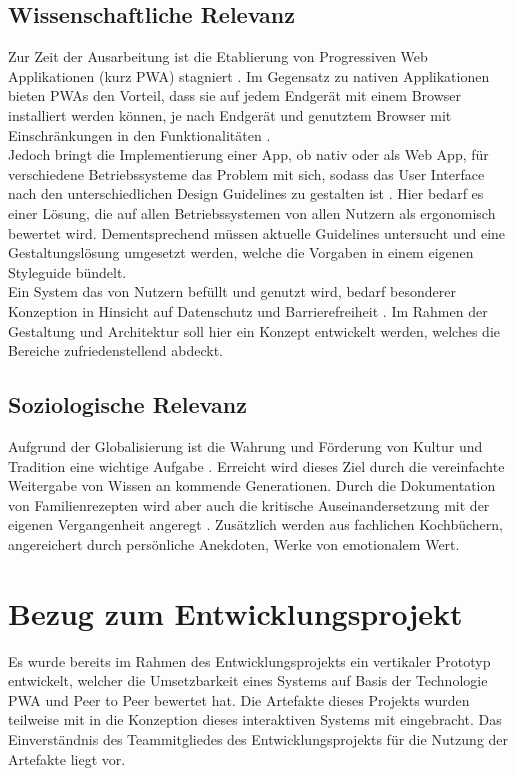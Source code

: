 \subsection{Wissenschaftliche Relevanz}
Zur Zeit der Ausarbeitung ist die Etablierung von Progressiven Web Applikationen (kurz PWA) stagniert \citep{Magomadov_2020}. Im Gegensatz zu nativen Applikationen bieten PWAs den Vorteil, dass sie auf jedem Endgerät mit einem Browser installiert werden können, je nach Endgerät und genutztem Browser mit Einschränkungen in den Funktionalitäten \citep{MScthesi20:online, Progress77:online}. \\
Jedoch bringt die Implementierung einer App, ob nativ oder als Web App, für verschiedene Betriebssysteme das Problem mit sich, sodass das User Interface nach den unterschiedlichen Design Guidelines zu gestalten ist \citep{Mitrovic2016ARO}. Hier bedarf es einer Lösung, die auf allen Betriebssystemen von allen Nutzern als ergonomisch bewertet wird. Dementsprechend müssen aktuelle Guidelines untersucht und eine Gestaltungslösung umgesetzt werden, welche die Vorgaben in einem eigenen Styleguide bündelt.\\
Ein System das von Nutzern befüllt und genutzt wird, bedarf besonderer Konzeption in Hinsicht auf Datenschutz und Barrierefreiheit \citep{Privacya9:online}. Im Rahmen der Gestaltung und Architektur soll hier ein Konzept entwickelt werden, welches die Bereiche zufriedenstellend abdeckt.

\subsection{Soziologische Relevanz}
Aufgrund der Globalisierung ist die Wahrung und Förderung von Kultur und Tradition eine wichtige Aufgabe \citep{BryanTurner_2016}. Erreicht wird dieses Ziel durch die vereinfachte Weitergabe von Wissen an kommende Generationen. Durch die Dokumentation von Familienrezepten wird aber auch die kritische Auseinandersetzung mit der eigenen Vergangenheit angeregt \citep{76f9434be2ae4e23b9f44d93097c915c}. Zusätzlich werden aus fachlichen Kochbüchern, angereichert durch persönliche Anekdoten, Werke von emotionalem Wert.

\section{Bezug zum Entwicklungsprojekt}
Es wurde bereits im Rahmen des Entwicklungsprojekts \citep{cobanmai2021} ein vertikaler Prototyp entwickelt, welcher die Umsetzbarkeit eines Systems auf Basis der Technologie PWA und Peer to Peer bewertet hat. Die Artefakte dieses Projekts wurden teilweise mit in die Konzeption dieses interaktiven Systems mit eingebracht. Das Einverständnis des Teammitgliedes des Entwicklungsprojekts für die Nutzung der Artefakte liegt vor.

